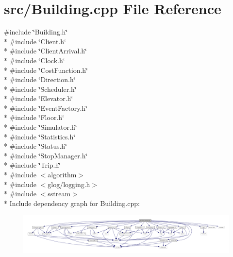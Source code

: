 \section{src/\+Building.cpp File Reference}
\label{_building_8cpp}
{\ttfamily \#include \char`\"{}Building.\+h\char`\"{}}\\*
{\ttfamily \#include \char`\"{}Client.\+h\char`\"{}}\\*
{\ttfamily \#include \char`\"{}Client\+Arrival.\+h\char`\"{}}\\*
{\ttfamily \#include \char`\"{}Clock.\+h\char`\"{}}\\*
{\ttfamily \#include \char`\"{}Cost\+Function.\+h\char`\"{}}\\*
{\ttfamily \#include \char`\"{}Direction.\+h\char`\"{}}\\*
{\ttfamily \#include \char`\"{}Scheduler.\+h\char`\"{}}\\*
{\ttfamily \#include \char`\"{}Elevator.\+h\char`\"{}}\\*
{\ttfamily \#include \char`\"{}Event\+Factory.\+h\char`\"{}}\\*
{\ttfamily \#include \char`\"{}Floor.\+h\char`\"{}}\\*
{\ttfamily \#include \char`\"{}Simulator.\+h\char`\"{}}\\*
{\ttfamily \#include \char`\"{}Statistics.\+h\char`\"{}}\\*
{\ttfamily \#include \char`\"{}Status.\+h\char`\"{}}\\*
{\ttfamily \#include \char`\"{}Stop\+Manager.\+h\char`\"{}}\\*
{\ttfamily \#include \char`\"{}Trip.\+h\char`\"{}}\\*
{\ttfamily \#include $<$algorithm$>$}\\*
{\ttfamily \#include $<$glog/logging.\+h$>$}\\*
{\ttfamily \#include $<$sstream$>$}\\*
Include dependency graph for Building.\+cpp\+:\nopagebreak
\begin{figure}[H]
\begin{center}
\leavevmode
\includegraphics[width=350pt]{_building_8cpp__incl}
\end{center}
\end{figure}
